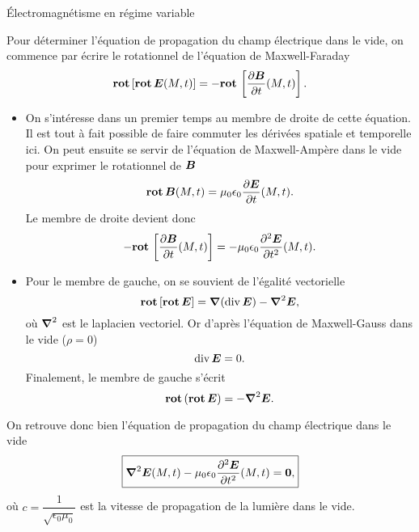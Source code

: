 \begin{corr}{Électromagnétisme en régime variable}
	\begin{corrlist}
		\item Pour déterminer l'équation de propagation du champ électrique
		  dans le vide, on commence par écrire le rotationnel de 
		  l'équation de Maxwell-Faraday
		  \begin{equation*}
			  \rot[\rot \vece(M, t)] = -\rot\left[\dd{\vecb}{t}(M, t)\right].
		  \end{equation*}
		  \begin{itemize}
		 	 \item On s'intéresse dans un premier temps au membre 
			   de droite de cette équation. Il est tout à fait possible 
			   de faire commuter les dérivées spatiale et temporelle ici.
			   On peut ensuite se servir de l'équation de Maxwell-Ampère
			   dans le vide pour exprimer le rotationnel de $\vecb$
			   \begin{equation*}
				   \rot \vecb(M, t) = \mu_0 \epsilon_0 
				   \dd{\vece}{t}(M, t).
			   \end{equation*}
			   Le membre de droite devient donc
			   \begin{equation*}
				   - \rot\left[\dd{\vecb}{t}(M, t)\right] = 
				   - \mu_0 \epsilon_0 \dd{^2\vece}{t^2}(M, t).
			  \end{equation*}

		  	\item Pour le membre de gauche, on se souvient de l'égalité
			  vectorielle
			  \begin{equation*}
				  \rot[\rot \vece] = \grad(\div \vece) - 
				  \laplacien \vece,
			  \end{equation*}
			  où $\laplacien$ est le laplacien vectoriel. Or d'après
			  l'équation de Maxwell-Gauss dans le vide ($\rho = 0$)
			  \begin{equation*}
				  \div \vece = 0.
			  \end{equation*}
			  Finalement, le membre de gauche s'écrit
			  \begin{equation*}
				  \rot(\rot \vece) = -\laplacien \vece.
			  \end{equation*}
		  \end{itemize}
		  On retrouve donc bien l'équation de propagation du champ électrique
		  dans le vide
		  \begin{equation*}
			  \boxed{
				  \laplacien \vece(M, t) - \mu_0 \epsilon_0
				  \dd{^2 \vece}{t^2}(M, t) = \vec{0},
		  }
		  \end{equation*}
		  où $c = \dfrac{1}{\sqrt{\epsilon_0 \mu_0}}$ est la vitesse
		  de propagation de la lumière dans le vide.


\end{corrlist}
\end{corr}
